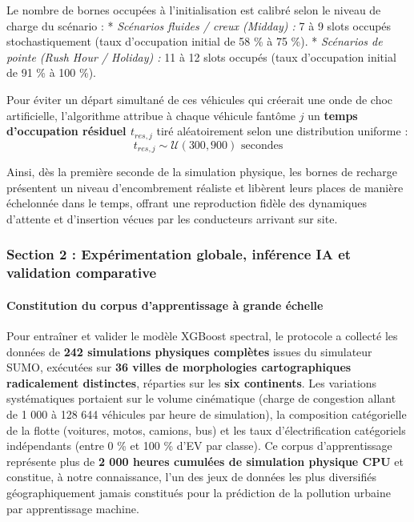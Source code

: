 \documentclass[10pt, a4paper]{article}
\begin{document}
Le nombre de bornes occupées à l'initialisation est calibré selon le
niveau de charge du scénario : * \emph{Scénarios fluides / creux
(Midday) :} 7 à 9 slots occupés stochastiquement (taux d'occupation
initial de 58 \% à 75 \%). * \emph{Scénarios de pointe (Rush Hour /
Holiday) :} 11 à 12 slots occupés (taux d'occupation initial de 91 \% à
100 \%).

Pour éviter un départ simultané de ces véhicules qui créerait une onde
de choc artificielle, l'algorithme attribue à chaque véhicule fantôme
\(j\) un \textbf{temps d'occupation résiduel \(t_{res, j}\)} tiré
aléatoirement selon une distribution uniforme :
\[t_{res, j} \sim \mathcal{U}(300, 900) \text{ secondes}\]

Ainsi, dès la première seconde de la simulation physique, les bornes de
recharge présentent un niveau d'encombrement réaliste et libèrent leurs
places de manière échelonnée dans le temps, offrant une reproduction
fidèle des dynamiques d'attente et d'insertion vécues par les
conducteurs arrivant sur site.

\subsubsection{Section 2 : Expérimentation globale, inférence IA et
validation
comparative}\label{section-2-expuxe9rimentation-globale-infuxe9rence-ia-et-validation-comparative}

\paragraph{Constitution du corpus d'apprentissage à grande
échelle}\label{constitution-du-corpus-dapprentissage-uxe0-grande-uxe9chelle}

Pour entraîner et valider le modèle XGBoost spectral, le protocole a
collecté les données de \textbf{242 simulations physiques complètes}
issues du simulateur SUMO, exécutées sur \textbf{36 villes de
morphologies cartographiques radicalement distinctes}, réparties sur les
\textbf{six continents}. Les variations systématiques portaient sur le
volume cinématique (charge de congestion allant de 1 000 à 128 644
véhicules par heure de simulation), la composition catégorielle de la
flotte (voitures, motos, camions, bus) et les taux d'électrification
catégoriels indépendants (entre 0 \% et 100 \% d'EV par classe). Ce
corpus d'apprentissage représente plus de \textbf{2 000 heures cumulées
de simulation physique CPU} et constitue, à notre connaissance, l'un des
jeux de données les plus diversifiés géographiquement jamais constitués
pour la prédiction de la pollution urbaine par apprentissage machine.
\end{document}
